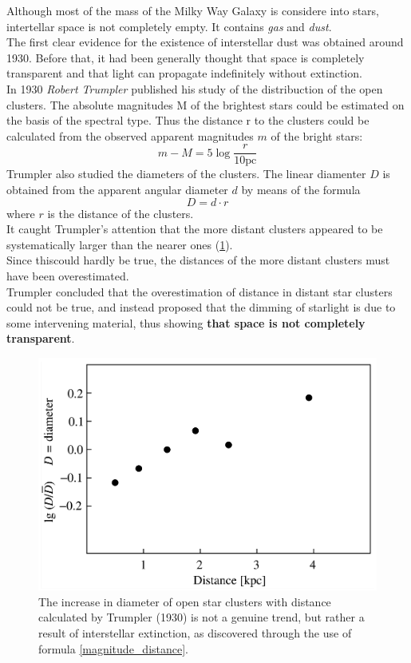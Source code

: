 \documentclass[a4paper,11pt,twoside]{book}
\begin{document}
Although most of the mass of the Milky Way Galaxy is considere into stars, intertellar space is not completely empty. It contains \textit{gas} and \textit{dust}.\\


The first clear evidence for the existence of interstellar dust was obtained around 1930. Before that, it had been generally thought that space is completely transparent and that light can propagate indefinitely without extinction. \\

In 1930 \textit{Robert Trumpler} published his study of the distribuction of the open clusters.
The absolute magnitudes M of the brightest stars could be estimated on the basis of the spectral type. Thus the distance r to the clusters could be calculated from the observed apparent magnitudes $m$ of the bright stars:
\begin{equation}
	m-M = 5\log{\frac{r}{10 \textrm{pc}}}
	\label{magnitude_distance}
\end{equation}
Trumpler also studied the diameters of the clusters. The linear diamenter $D$ is obtained from the apparent angular diameter $d$ by means of the formula 
\begin{equation}
	D=d\cdot r
\end{equation}
where $r$ is the distance of the clusters.\\

It caught Trumpler’s attention that the more distant clusters appeared to be systematically
larger than the nearer ones (\ref{fig:trumpler_cluster_distance}).\\

Since thiscould hardly be true, the distances of the more distant clusters must have been overestimated.\\
Trumpler concluded that the overestimation of distance in distant star clusters could not be true, and instead proposed that the dimming of starlight is due to some intervening material, thus showing \textbf{that space is not completely transparent}.

\begin{figure}[H]
	\centering
	\includegraphics[width=0.7\linewidth]{images/trumpler_cluster_diameter.png}
	\caption{The increase in diameter of open star clusters with distance calculated by Trumpler (1930) is not a genuine trend, but rather a result of interstellar extinction, as discovered through the use of formula \eqref{magnitude_distance}.}
	\label{fig:trumpler_cluster_distance}
\end{figure}
\end{document}
